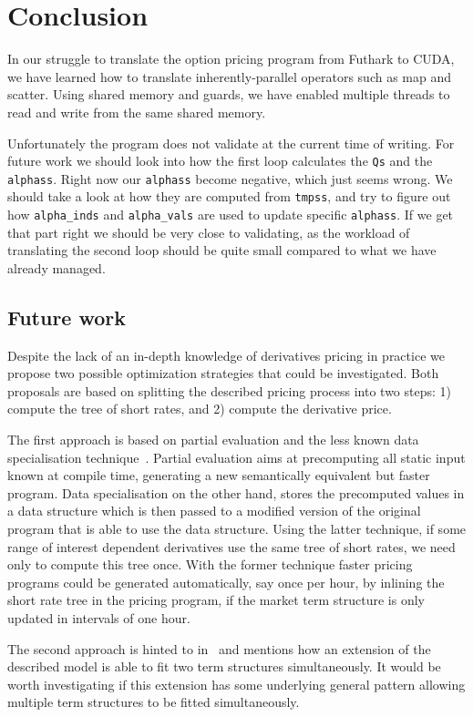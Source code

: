 \section{Conclusion}
In our struggle to translate the option pricing program from
Futhark to CUDA, we have learned how to translate inherently-parallel
operators such as map and scatter. Using shared memory and guards,
we have enabled multiple threads to read and write from the same
shared memory.

Unfortunately the program does not validate at the current
time of writing. For future work we should look into how
the first loop calculates the \texttt{Qs} and the \texttt{alphass}.
Right now our \texttt{alphass} become negative, which just seems wrong.
We should take a look at how they are computed from \texttt{tmpss},
and try to figure out how \texttt{alpha\_inds} and \texttt{alpha\_vals} are
used to update specific \texttt{alphass}. If we get that part right
we should be very close to validating, as the workload of
translating the second loop should be quite small compared
to what we have already managed.

\subsection{Future work}

Despite the lack of an in-depth knowledge of derivatives
pricing in practice we propose two possible optimization
strategies that could be investigated. Both proposals are
based on splitting the described pricing process into two
steps: 1) compute the tree of short rates, and 2) compute
the derivative price.

The first approach is based on partial evaluation and the
less known data specialisation
technique~\cite{malmkjaer,chirokoff}. Partial evaluation
aims at precomputing all static input known at compile time,
generating a new semantically equivalent but faster
program. Data specialisation on the other hand, stores the
precomputed values in a data structure which is then passed
to a modified version of the original program that is able
to use the data structure. Using the latter technique, if some
range of interest dependent derivatives use the same tree of
short rates, we need only to compute this tree once. With
the former technique faster pricing programs could be
generated automatically, say once per hour, by inlining the
short rate tree in the pricing program, if the market term
structure is only updated in intervals of one hour.

The second approach is hinted to in~\cite{HullWhite94} and
mentions how an extension of the described model is able to
fit two term structures simultaneously. It would be worth
investigating if this extension has some underlying general
pattern allowing multiple term structures to be fitted
simultaneously.
